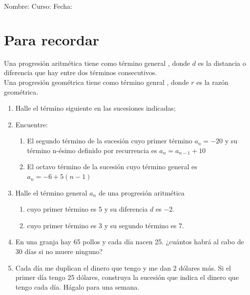 \documentclass[fleqn]{article}
\newcommand{\LineaNombre}{%
\par
\vspace{\baselineskip}
Nombre:\hrulefill \; Curso: \underline{\hspace*{48pt}} \; Fecha: \underline{\hspace*{2.5cm}} \relax
\par}
\begin{document}
\LineaNombre
\section*{Para recordar}
Una progresi\'on aritmética tiene como término general , donde $d$ es la distancia o diferencia que hay entre dos términos consecutivos.\\

Una progresión geométrica tiene como término genral ,
donde $r$ es la razón geométrica.
\begin{enumerate}
\item Halle el término siguiente en las sucesiones indicadas;
  \begin{enumerate}
\end{enumerate}
\item Encuentre:
\begin{enumerate}
\item El segundo término de la sucesión cuyo primer término $a_n=-20$ y su término n-ésimo definido por recurrencia es $a_n=a_{n-1}+10$  \noanswer[.75in]
\item El octavo término de la sucesión cuyo término general es $a_n=-6+5(n-1)$ \noanswer[.75in]
\end{enumerate}
\newpage
\item Halle el término general $a_{n}$ de una progresión aritmética
\begin{enumerate}
\item cuyo primer término es 5 y su diferencia $d$ es $-2$. \noanswer
\item cuyo primer término es 3 y su segundo término es 7.\noanswer
\end{enumerate}
\item En una granja hay 65 pollos y cada día nacen 25. ¿cuántos habrá al cabo de 30 días si no muere ninguno?\noanswer
\item Cada día me duplican el dinero que tengo y me dan 2 dólares más. Si el primer día tengo 25 dólares, construya la sucesión que indica el dinero que tengo cada día. Hágalo para una semana.\noanswer
\end{enumerate}
\end{document}
